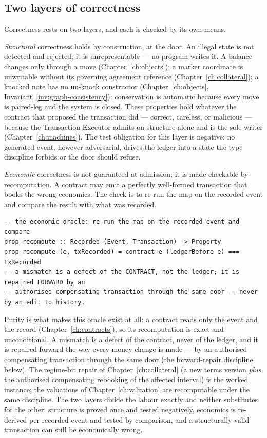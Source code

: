 \documentclass[11pt,a4paper]{article}
\begin{document}
\subsection{Two layers of correctness}

Correctness rests on two layers, and each is checked by its own means.

\emph{Structural} correctness holds by construction, at the door. An illegal state is not
detected and rejected; it is unrepresentable --- no program writes it. A balance changes
only through a move (Chapter~\ref{ch:objects}); a marker coordinate is unwritable without
its governing agreement reference (Chapter~\ref{ch:collateral}); a knocked note has no
un-knock constructor (Chapter~\ref{ch:objects}, Invariant~\ref{inv:graph-consistency});
conservation is automatic because every move is paired-leg and the system is closed. These
properties hold whatever the contract that proposed the transaction did --- correct,
careless, or malicious --- because the Transaction Executor admits on structure alone and
is the sole writer (Chapter~\ref{ch:machines}). The test obligation for this layer is
negative: no generated event, however adversarial, drives the ledger into a state the type
discipline forbids or the door should refuse.

\emph{Economic} correctness is not guaranteed at admission; it is made checkable by
recomputation. A contract may emit a perfectly well-formed transaction that books the wrong
economics. The check is to re-run the map on the recorded event and compare the result with
what was recorded.

\begin{lstlisting}
-- the economic oracle: re-run the map on the recorded event and compare
prop_recompute :: Recorded (Event, Transaction) -> Property
prop_recompute (e, txRecorded) = contract e (ledgerBefore e) === txRecorded
-- a mismatch is a defect of the CONTRACT, not the ledger; it is repaired FORWARD by an
-- authorised compensating transaction through the same door -- never by an edit to history.
\end{lstlisting}

Purity is what makes this oracle exist at all: a contract reads only the event and the
record (Chapter~\ref{ch:contracts}), so its recomputation is exact and unconditional. A
mismatch is a defect of the contract, never of the ledger, and it is repaired forward the way every
money change is made --- by an authorised compensating transaction through the same door
(the forward-repair discipline below). The regime-bit
repair of Chapter~\ref{ch:collateral} (a new terms version \emph{plus} the authorised compensating
rebooking of the affected interval) is the worked instance; the valuations of
Chapter~\ref{ch:valuation} are recomputable under the same discipline. The two layers
divide the labour exactly and neither substitutes for the other: structure is proved once
and tested negatively, economics is re-derived per recorded event and tested by comparison,
and a structurally valid transaction can still be economically wrong.
\end{document}
